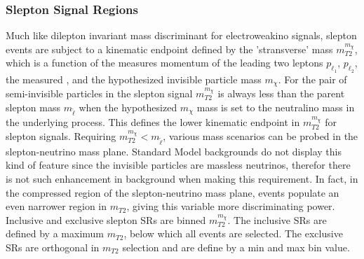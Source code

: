 \subsubsection{Slepton Signal Regions}
\label{sec:sr:mt2}
\iffalse
Figure~\ref{fig:METoverHTmt2} shows the $\met/H_{T}^{lep}$ distribution for slepton samples after applying all the signal region cuts except $\met/H_{T}^{lep}$ and $m_{T2}$.
 \begin{figure}[tbp]
  \centering
  \texttt{[image: /Users/sheenaschier/Documents/LaFiles/figures/thesis/signal\_regions/fig\_03b.pdf]}
 \caption{Distributions of $\met/H_{T}^{lep}$ for the slepton selections, after applying all signal region cuts except those on the $\met/H_{T}^{lep}$ and $m_{T2}$.  The red solid line indicates the cut applied in the signal region; events in the region below the red line are rejected. \textcolor{red}{Change to updated plot.}}
 \label{fig:METoverHTmt2}
 \end{figure}
 \fi
Much like dilepton invariant mass discriminant for electroweakino signals, slepton events are subject to a kinematic endpoint defined by the 'stransverse' mass $m^{m_\chi}_{T2}$, which is a function of the measures momentum of the leading two leptons $p_{\ell_1}$, $p_{\ell_2}$, the measured \pt, and the hypothesized invisible particle mass $m_\chi$.    For the pair of semi-invisible particles in the slepton signal $m^{m_\chi}_{T2}$ is always less than the parent slepton mass $m_{\tilde\ell}$ when the hypothesized $m_\chi$ mass is set to the neutralino mass in the underlying process.  This defines the lower kinematic endpoint in $m^{m_\chi}_{T2}$ for slepton signals.  Requiring $m^{m_\chi}_{T2} < m_{\tilde\ell}$, various mass scenarios can be probed in the slepton-neutrino mass plane.  Standard Model backgrounds do not display this kind of feature since the invisible particles are massless neutrinos, therefor there is not such enhancement in background when making this requirement.  In fact, in the compressed region of the slepton-neutrino mass  plane, events populate an even narrower region in $m_{T2}$, giving this variable more discriminating power.  Inclusive and exclusive slepton SRs are binned $m^{m_\chi}_{T2}$.  The inclusive SRs are defined by a maximum $m_{T2}$, below which all events are selected.  The exclusive SRs are orthogonal in $m_{T2}$ selection and are define by a min and max bin value.

